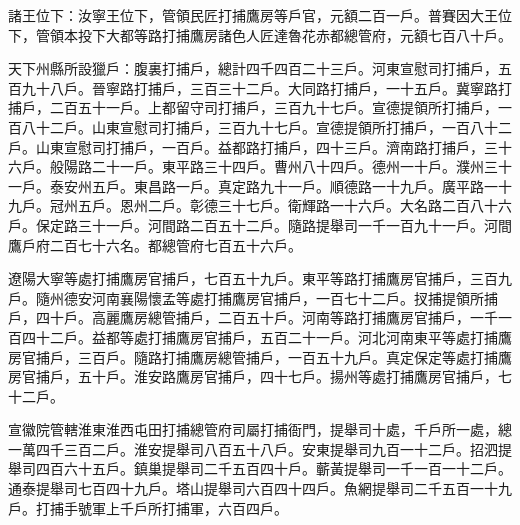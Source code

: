 \begin{pinyinscope}
 諸王位下：汝寧王位下，管領民匠打捕鷹房等戶官，元額二百一戶。普賽因大王位下，管領本投下大都等路打捕鷹房諸色人匠達魯花赤都總管府，元額七百八十戶。



 天下州縣所設獵戶：腹裏打捕戶，總計四千四百二十三戶。河東宣慰司打捕戶，五百九十八戶。晉寧路打捕戶，三百三十二戶。大同路打捕戶，一十五戶。冀寧路打捕戶，二百五十一戶。上都留守司打捕戶，三百九十七戶。宣德提領所打捕戶，一百八十二戶。山東宣慰司打捕戶，三百九十七戶。宣德提領所打捕戶，一百八十二戶。山東宣慰司打捕戶，一百戶。益都路打捕戶，四十三戶。濟南路打捕戶，三十六戶。般陽路二十一戶。東平路三十四戶。曹州八十四戶。德州一十戶。濮州三十一戶。泰安州五戶。東昌路一戶。真定路九十一戶。順德路一十九戶。廣平路一十九戶。冠州五戶。恩州二戶。彰德三十七戶。衛輝路一十六戶。大名路二百八十六戶。保定路三十一戶。河間路二百五十二戶。隨路提舉司一千一百九十一戶。河間鷹戶府二百七十六名。都總管府七百五十六戶。



 遼陽大寧等處打捕鷹房官捕戶，七百五十九戶。東平等路打捕鷹房官捕戶，三百九戶。隨州德安河南襄陽懷孟等處打捕鷹房官捕戶，一百七十二戶。扠捕提領所捕戶，四十戶。高麗鷹房總管捕戶，二百五十戶。河南等路打捕鷹房官捕戶，一千一百四十二戶。益都等處打捕鷹房官捕戶，五百二十一戶。河北河南東平等處打捕鷹房官捕戶，三百戶。隨路打捕鷹房總管捕戶，一百五十九戶。真定保定等處打捕鷹房官捕戶，五十戶。淮安路鷹房官捕戶，四十七戶。揚州等處打捕鷹房官捕戶，七十二戶。



 宣徽院管轄淮東淮西屯田打捕總管府司屬打捕衙門，提舉司十處，千戶所一處，總一萬四千三百二戶。淮安提舉司八百五十八戶。安東提舉司九百一十二戶。招泗提舉司四百六十五戶。鎮巢提舉司二千五百四十戶。蘄黃提舉司一千一百一十二戶。通泰提舉司七百四十九戶。塔山提舉司六百四十四戶。魚網提舉司二千五百一十九戶。打捕手號軍上千戶所打捕軍，六百四戶。



\end{pinyinscope}
